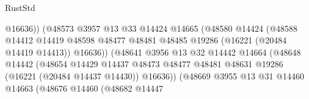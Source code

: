 \begin{lexlean}{RustStd}
\begin{coremodule}
                                              @16636))
                                          (@48573
                                            @3957
                                            @13
                                            @33
                                            @14424
                                            @14665
                                            (@48580
                                              @14424
                                              (@48588
                                                @14412
                                                @14419
                                                @48598
                                                @48477
                                                @48481
                                                @48485
                                                @19286
                                                (@16221 (@20484 @14419 @14413))
                                                @16636))
                                            (@48641
                                              @3956
                                              @13
                                              @32
                                              @14442
                                              @14664
                                              (@48648
                                                @14442
                                                (@48654
                                                  @14429
                                                  @14437
                                                  @48473
                                                  @48477
                                                  @48481
                                                  @48631
                                                  @19286
                                                  (@16221 (@20484 @14437 @14430))
                                                  @16636))
                                              (@48669
                                                @3955
                                                @13
                                                @31
                                                @14460
                                                @14663
                                                (@48676
                                                  @14460
                                                  (@48682
                                                    @14447

\end{coremodule}
\end{lexlean}
